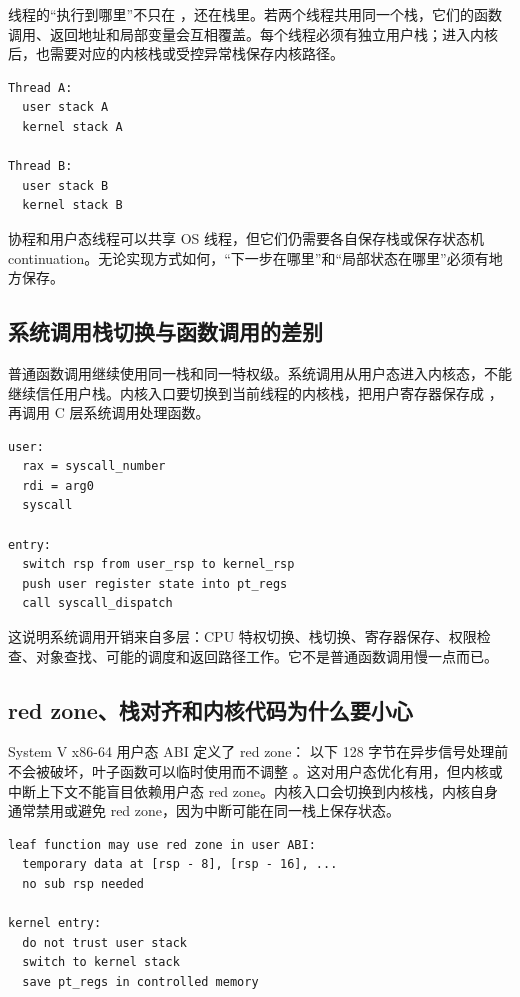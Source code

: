 线程的“执行到哪里”不只在 ，还在栈里。若两个线程共用同一个栈，它们的函数调用、返回地址和局部变量会互相覆盖。每个线程必须有独立用户栈；进入内核后，也需要对应的内核栈或受控异常栈保存内核路径。

\begin{lstlisting}
Thread A:
  user stack A
  kernel stack A

Thread B:
  user stack B
  kernel stack B
\end{lstlisting}

协程和用户态线程可以共享 OS 线程，但它们仍需要各自保存栈或保存状态机 continuation。无论实现方式如何，“下一步在哪里”和“局部状态在哪里”必须有地方保存。

\subsection{系统调用栈切换与函数调用的差别}

普通函数调用继续使用同一栈和同一特权级。系统调用从用户态进入内核态，不能继续信任用户栈。内核入口要切换到当前线程的内核栈，把用户寄存器保存成 ，再调用 C 层系统调用处理函数。

\begin{lstlisting}
user:
  rax = syscall_number
  rdi = arg0
  syscall

entry:
  switch rsp from user_rsp to kernel_rsp
  push user register state into pt_regs
  call syscall_dispatch
\end{lstlisting}

这说明系统调用开销来自多层：CPU 特权切换、栈切换、寄存器保存、权限检查、对象查找、可能的调度和返回路径工作。它不是普通函数调用慢一点而已。

\subsection{red zone、栈对齐和内核代码为什么要小心}

System V x86-64 用户态 ABI 定义了 red zone： 以下 128 字节在异步信号处理前不会被破坏，叶子函数可以临时使用而不调整 。这对用户态优化有用，但内核或中断上下文不能盲目依赖用户态 red zone。内核入口会切换到内核栈，内核自身通常禁用或避免 red zone，因为中断可能在同一栈上保存状态。

\begin{lstlisting}
leaf function may use red zone in user ABI:
  temporary data at [rsp - 8], [rsp - 16], ...
  no sub rsp needed

kernel entry:
  do not trust user stack
  switch to kernel stack
  save pt_regs in controlled memory
\end{lstlisting}


